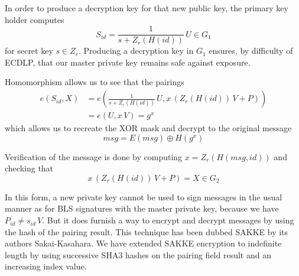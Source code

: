 \documentclass{yellowpaper}
\begin{document}
In order to produce a decryption key for that new public key, the primary key holder computes $$S_{id} = \frac{1}{s + Z_r(H(id))} \, U \in G_1$$ for secret key $s \in Z_r$. Producing a decryption key in $G_1$ ensures, by difficulty of ECDLP, that our master private key remains safe against exposure.

Homomorphism allows us to see that the pairings 
$$
\begin{align}
    e(S_{id}, X) &= e(\frac{1}{s + Z_r(H(id))}\, U, x\,(Z_r(H(id)) \, V + P)) \\
    &= e(U, x\, V) = g^x
\end{align}$$ 
which allows us to recreate the XOR mask and decrypt to the original message 
$$msg = E(msg) \oplus H(g^x)$$ 

Verification of the message is done by computing $x = Z_r(H(msg, id))$ and checking that 
$$x\, (Z_r(H(id))\, V + P) = X \in G_2$$

In this form, a new private key cannot be used to sign messages in the usual manner as for BLS signatures with the master private key, because we have $P_{id} \neq s_{id} \, V$. But it does furnish a way to encrypt and decrypt messages by using the hash of the pairing result. This technique has been dubbed SAKKE by its authors Sakai-Kasahara\cite{sakke}. We have extended SAKKE encryption to indefinite length by using successive SHA3 hashes on the pairing field result and an increasing index value.

\balance


%   
\end{document}
